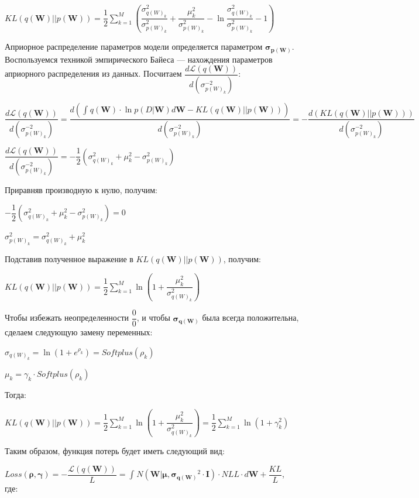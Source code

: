 \documentclass{article}
\begin{document}
$
KL(q(\mathbf{W}) || p(\mathbf{W})) =
\dfrac{1}{2}\sum_{k=1}^{M}(\dfrac{\sigma_{{q(W)_{k}}}^2}{\sigma_{{p(W)_{k}}}^2} + \dfrac{\mu_{k}^2}{\sigma_{{p(W)_{k}}}^2} - \ln{\dfrac{\sigma_{{q(W)_{k}}}^2}{\sigma_{{p(W)_{k}}}^2}} - 1)
$

Априорное распределение параметров модели определяется параметром $\pmb{\sigma_{p(\mathbf{W})}}$. Воспользуемся техникой эмпирического Байеса — нахождения параметров априорного распределения из данных. Посчитаем
$\dfrac{d\mathcal{L}(q(\mathbf{W}))}{d ({\sigma_{p(W)_{k}}^{-2}})}$:

$
\dfrac{d\mathcal{L}(q(\mathbf{W}))}{d ({\sigma_{p(W)_{k}}^{-2}})} =
\dfrac{d (\int_{}{} q(\mathbf{W}) \cdot \ln{p(D | \mathbf{W})} d\mathbf{W} - KL(q(\mathbf{W}) || p(\mathbf{W})))}{d ({\sigma_{p(W)_{k}}^{-2}})} =
- \dfrac{d (KL(q(\mathbf{W}) || p(\mathbf{W})))}{d ({\sigma_{p(W)_{k}}^{-2}})}$

$
\dfrac{d\mathcal{L}(q(\mathbf{W}))}{d ({\sigma_{p(W)_{k}}^{-2}})} =
-\dfrac{1}{2}(\sigma_{{q(W)_{k}}}^2 + \mu_{k}^2 - \sigma_{{p(W)_{k}}}^2)
$

Приравняв производную к нулю, получим:

$
-\dfrac{1}{2}(\sigma_{{q(W)_{k}}}^2 + \mu_{k}^2 - \sigma_{{p(W)_{k}}}^2) = 0
$

$
\sigma_{{p(W)_{k}}}^2 = \sigma_{{q(W)_{k}}}^2 + \mu_{k}^2
$

Подставив полученное выражение в $KL(q(\mathbf{W}) || p(\mathbf{W}))$, получим:

$
KL(q(\mathbf{W}) || p(\mathbf{W})) =
\dfrac{1}{2}\sum_{k=1}^{M}\ln({1 + \dfrac{\mu_{k}^2}{\sigma_{{q(W)_{k}}}^2}})
$

Чтобы избежать неопределенности $\dfrac{0}{0}$, и чтобы $\pmb{\sigma_{q(\mathbf{W})}}$ была всегда положительна, сделаем следующую замену переменных:

$\sigma_{{q(W)_{k}}} = \ln({1 + e^{\rho_{k}}}) = Softplus(\rho_{k})$

$\mu_{k} = \gamma_{k} \cdot Softplus(\rho_{k})$

Тогда:

$
KL(q(\mathbf{W}) || p(\mathbf{W})) =
\dfrac{1}{2}\sum_{k=1}^{M}\ln({1 + \dfrac{\mu_{k}^2}{\sigma_{{q(W)_{k}}}^2}}) =
\dfrac{1}{2}\sum_{k=1}^{M}\ln({1 + \gamma_{k}^{2}})
$

Таким образом, функция потерь будет иметь следующий вид:

$
Loss(\pmb{\rho}, \pmb{\gamma}) =
- \dfrac{\mathcal{L}(q(\mathbf{W}))}{L} =
\int_{}{} N(\mathbf{W} | \pmb{\mu}, \pmb{\sigma_{q(\mathbf{W})}}^{2} \cdot \mathbf{I}) \cdot NLL \cdot d\mathbf{W} + \dfrac{KL}{L}
$, где:
\end{document}
